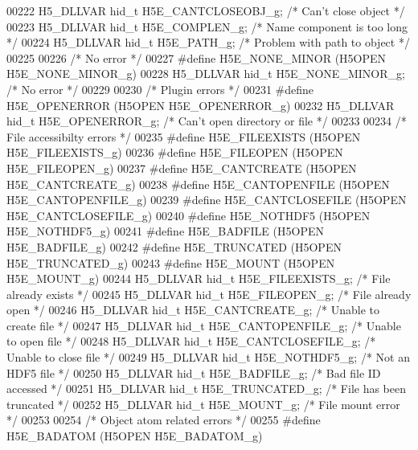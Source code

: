\begin{DoxyCode}
00222 H5\_DLLVAR hid\_t H5E\_CANTCLOSEOBJ\_g;  \textcolor{comment}{/* Can't close object */}
00223 H5\_DLLVAR hid\_t H5E\_COMPLEN\_g;       \textcolor{comment}{/* Name component is too long */}
00224 H5\_DLLVAR hid\_t H5E\_PATH\_g;          \textcolor{comment}{/* Problem with path to object */}
00225 
00226 \textcolor{comment}{/* No error */}
00227 \textcolor{preprocessor}{#define H5E\_NONE\_MINOR       (H5OPEN H5E\_NONE\_MINOR\_g)}
00228 H5\_DLLVAR hid\_t H5E\_NONE\_MINOR\_g;    \textcolor{comment}{/* No error */}
00229 
00230 \textcolor{comment}{/* Plugin errors */}
00231 \textcolor{preprocessor}{#define H5E\_OPENERROR        (H5OPEN H5E\_OPENERROR\_g)}
00232 H5\_DLLVAR hid\_t H5E\_OPENERROR\_g;     \textcolor{comment}{/* Can't open directory or file */}
00233 
00234 \textcolor{comment}{/* File accessibilty errors */}
00235 \textcolor{preprocessor}{#define H5E\_FILEEXISTS       (H5OPEN H5E\_FILEEXISTS\_g)}
00236 \textcolor{preprocessor}{#define H5E\_FILEOPEN         (H5OPEN H5E\_FILEOPEN\_g)}
00237 \textcolor{preprocessor}{#define H5E\_CANTCREATE       (H5OPEN H5E\_CANTCREATE\_g)}
00238 \textcolor{preprocessor}{#define H5E\_CANTOPENFILE     (H5OPEN H5E\_CANTOPENFILE\_g)}
00239 \textcolor{preprocessor}{#define H5E\_CANTCLOSEFILE    (H5OPEN H5E\_CANTCLOSEFILE\_g)}
00240 \textcolor{preprocessor}{#define H5E\_NOTHDF5          (H5OPEN H5E\_NOTHDF5\_g)}
00241 \textcolor{preprocessor}{#define H5E\_BADFILE          (H5OPEN H5E\_BADFILE\_g)}
00242 \textcolor{preprocessor}{#define H5E\_TRUNCATED        (H5OPEN H5E\_TRUNCATED\_g)}
00243 \textcolor{preprocessor}{#define H5E\_MOUNT            (H5OPEN H5E\_MOUNT\_g)}
00244 H5\_DLLVAR hid\_t H5E\_FILEEXISTS\_g;    \textcolor{comment}{/* File already exists */}
00245 H5\_DLLVAR hid\_t H5E\_FILEOPEN\_g;      \textcolor{comment}{/* File already open */}
00246 H5\_DLLVAR hid\_t H5E\_CANTCREATE\_g;    \textcolor{comment}{/* Unable to create file */}
00247 H5\_DLLVAR hid\_t H5E\_CANTOPENFILE\_g;  \textcolor{comment}{/* Unable to open file */}
00248 H5\_DLLVAR hid\_t H5E\_CANTCLOSEFILE\_g; \textcolor{comment}{/* Unable to close file */}
00249 H5\_DLLVAR hid\_t H5E\_NOTHDF5\_g;       \textcolor{comment}{/* Not an HDF5 file */}
00250 H5\_DLLVAR hid\_t H5E\_BADFILE\_g;       \textcolor{comment}{/* Bad file ID accessed */}
00251 H5\_DLLVAR hid\_t H5E\_TRUNCATED\_g;     \textcolor{comment}{/* File has been truncated */}
00252 H5\_DLLVAR hid\_t H5E\_MOUNT\_g;         \textcolor{comment}{/* File mount error */}
00253 
00254 \textcolor{comment}{/* Object atom related errors */}
00255 \textcolor{preprocessor}{#define H5E\_BADATOM          (H5OPEN H5E\_BADATOM\_g)}

\end{DoxyCode}
